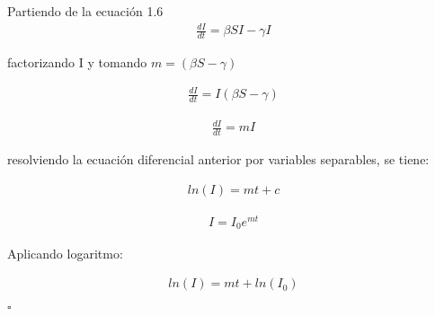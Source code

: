 \begin{Dem}
Partiendo de la ecuación 1.6 
\begin{align*}
\frac{dI}{dt} = \beta SI - \gamma I
\end{align*}

factorizando I y tomando $m = \left(\beta S - \gamma \right)$

\begin{align*}
\frac{dI}{dt} = I \left( \beta S - \gamma \right)
\end{align*}

\begin{align*}
\frac{dI}{dt} = mI
\end{align*}

resolviendo la ecuación diferencial anterior por variables separables, se tiene:

\begin{align*}
ln(I) = mt + c
\end{align*}

\begin{align*}
I = I_{0} e^{mt} 
\end{align*}

Aplicando logaritmo:

\begin{align*}
ln(I) = mt + ln(I_{0})
\end{align*}

\hfill	$\square$

\end{Dem}









%